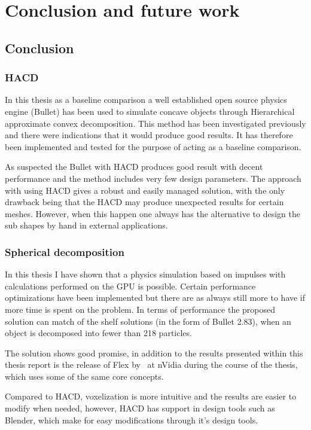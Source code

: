 \chapter{Conclusion and future work}
\section{Conclusion}
\subsection{HACD}
In this thesis as a baseline comparison a well established open source physics engine
(Bullet) has been used to simulate concave objects through Hierarchical approximate
 convex decomposition. This method has been investigated previously and there were
 indications that it would produce good results. It has therefore been implemented
 and tested for the purpose of acting as a baseline comparison.

As suspected the Bullet with HACD produces good result with decent performance and
the method includes very few design parameters. The approach with using HACD gives
a robust and easily managed solution, with the only drawback being that the HACD
may produce unexpected results for certain meshes. However, when this happen
one always has the alternative to design the sub shapes by hand in external applications.

\subsection{Spherical decomposition}
In this thesis I have shown that a physics simulation based on impulses with
calculations performed on the GPU is possible. Certain performance optimizations
have been implemented but there are as always still more to have if more time is
spent on the problem. In terms of performance the proposed solution can match of the shelf
solutions (in the form of Bullet 2.83), when an object is decomposed into fewer than
218 particles.

The solution shows good promise, in addition to the results presented within this
thesis report is the release of Flex by~\cite{flex} at nVidia
during the course of the thesis, which uses some of the same core concepts.

Compared to HACD, voxelization is more intuitive and the results are easier to modify
when needed, however, HACD has support in design tools such as Blender, which make
for easy modifications through it's design tools.

